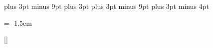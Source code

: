 \titlespacing{\chapter}{0pt}{\parskip}{-\parskip}
\titlespacing{\section}{0pt}{\parskip}{-\parskip}
\titlespacing{\subsection}{0pt}{\parskip}{-\parskip}
\titlespacing{\subsubsection}{0pt}{\parskip}{-\parskip}

\abovedisplayskip=12pt plus 3pt minus 9pt
\abovedisplayshortskip=0pt plus 3pt
\belowdisplayskip=12pt plus 3pt minus 9pt
\belowdisplayshortskip=7pt plus 3pt minus 4pt

\renewcommand{\theenumi}{\arabic{enumi}.} %
\renewcommand{\labelenumi}{\arabic{enumi}.} %
\renewcommand{\theenumii}{\arabic{enumii}.} %
\renewcommand{\labelenumii}{\arabic{enumi}.\arabic{enumii}.}%
\renewcommand{\theenumiii}{\arabic{enumiii}} %
\renewcommand{\labelenumiii}{\arabic{enumi}.\arabic{enumii}.\arabic{enumiii}.}%

\renewcommand{\thechapter}{\arabic{chapter}.}
\renewcommand{\thesection}{\thechapter\arabic{section}.}
\renewcommand{\thesubsection}{\thesection\arabic{subsection}.}
\renewcommand{\thetable}{\arabic{table}}
\renewcommand{\thefigure}{\arabic{figure}}
\renewcommand{\theequation}{\arabic{equation}} %

\addto{}

\newcommand{\changefont}{%
    \fontsize{14pt}{14pt}\selectfont
}

\usepackage{fancyhdr}
\pagestyle{fancy} {%
	\fancyhf{}
	\fancyhead[CE,CO]{\changefont \thepage}
	\headsep = -1.5cm
}

\renewcommand{\headrulewidth}{0pt}
\renewcommand{\footrulewidth}{0pt}

\fancypagestyle{plain}{%
	\fancyhf{}
	\fancyhead[CE,CO]{\changefont \thepage}
	\headsep = -1.5cm
}

\titleformat{\section}[runin]{}{}{}{}[]

